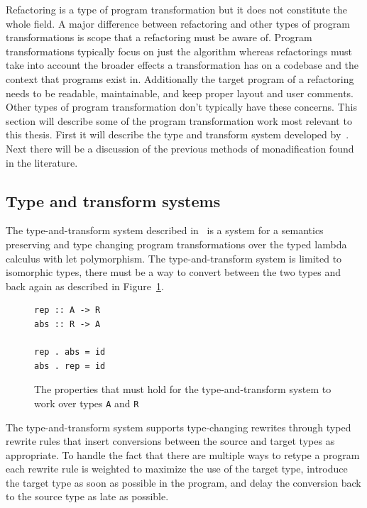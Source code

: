 Refactoring is a type of program transformation but it does not constitute the whole field. A major difference between refactoring and other types of program transformations is scope that a refactoring must be aware of. Program transformations typically focus on just the algorithm whereas refactorings must take into account the broader effects a transformation has on a codebase and the context that programs exist in. Additionally the target program of a refactoring needs to be readable, maintainable, and keep proper layout and user comments. Other types of program transformation don't typically have these concerns. This section will describe some of the program transformation work most relevant to this thesis. First it will describe the type and transform system developed by~\citep{typeAndTransformSemantics}. Next there will be a discussion of the previous methods of monadification found in the literature. 

\subsection{Type and transform systems}

The type-and-transform system described in~\citep{typeAndTransformSemantics} is a system for a semantics preserving and type changing program transformations over the typed lambda calculus with let polymorphism. The type-and-transform system is limited to isomorphic types, there must be a way to convert between the two types and back again as described in Figure~\ref{transformIso}.

\begin{figure}[t]
\begin{lstlisting}
rep :: A -> R
abs :: R -> A

rep . abs = id
abs . rep = id
\end{lstlisting}
\caption{The properties that must hold for the type-and-transform system to work over types \texttt{A} and \texttt{R}}
\label{transformIso}
\end{figure} 

The type-and-transform system supports type-changing rewrites through typed rewrite rules that insert conversions between the source and target types as appropriate. To handle the fact that there are multiple ways to retype a program each rewrite rule is weighted to maximize the use of the target type, introduce the target type as soon as possible in the program, and delay the conversion back to the source type as late as possible.

